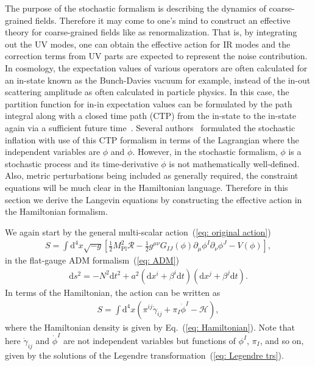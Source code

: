 \documentclass[a4paper,11pt]{article}
\newcommand{\dd}{\mathrm{d}}
\newcommand{\Mpl}{M_\text{Pl}}
\newcommand{\scrH}{\mathscr{H}}
\newcommand{\calR}{\mathcal{R}}
\newcommand{\bae}[1]{\begin{align} #1 \end{align}}
\begin{document}
The purpose of the stochastic formalism is describing the dynamics of coarse-grained fields. 
Therefore it may come to one's mind to construct an effective theory for coarse-grained fields like as renormalization.
That is, by integrating out the UV modes, one can obtain the effective action for IR modes and the correction terms from UV parts 
are expected to represent the noise contribution. In cosmology, the expectation values of various operators are often calculated for 
an in-state known as the Bunch-Davies vacuum for example, instead of the in-out scattering amplitude as often calculated in particle physics.
In this case, the partition function for in-in expectation values can be formulated by the path integral along with a closed time path (CTP) from the in-state
to the in-state again via a sufficient future time~\cite{Schwinger:1960qe,Feynman:1963fq}.
Several authors~\cite{Morikawa:1989xz,Matarrese:2003ye,Levasseur:2013ffa,Moss:2016uix} formulated the stochastic inflation 
with use of this CTP formalism in terms of the Lagrangian where the independent variables are $\phi$ and $\dot{\phi}$.
However, in the stochastic formalism, $\phi$ is a stochastic process and its time-derivative $\dot{\phi}$ is not mathematically well-defined.
Also, metric perturbations being included as generally required, the constraint equations will be much clear in the Hamiltonian language.
Therefore in this section we derive the Langevin equations by constructing the effective action in the Hamiltonian formalism.


We again start by the general multi-scalar action~(\ref{eq: original action}) 
\bae{
	S=\int\dd^4x\sqrt{-g}\left[\frac{1}{2}\Mpl^2\calR-\frac{1}{2}g^{\mu\nu}G_{IJ}(\phi)\partial_\mu\phi^I\partial_\nu\phi^J-V(\phi)\right],
}
in the flat-gauge ADM formalism~(\ref{eq: ADM})
\bae{
	\dd s^2=-N^2\dd t^2+a^2(\dd x^i+\beta^i\dd t)(\dd x^j+\beta^j\dd t).
}
In terms of the Hamiltonian, the action can be written as
\bae{
	S=\int\dd^4x(\pi^{ij}\dot{\gamma}_{ij}+\pi_I\dot{\phi}^I-\scrH),
}
where the Hamiltonian density is given by Eq.~(\ref{eq: Hamiltonian}).
Note that here $\dot{\gamma}_{ij}$ and $\dot{\phi}^I$ are not independent variables but functions of $\phi^I$, $\pi_I$, and so on,
given by the solutions of the Legendre transformation~(\ref{eq: Legendre trs}).
\end{document}
